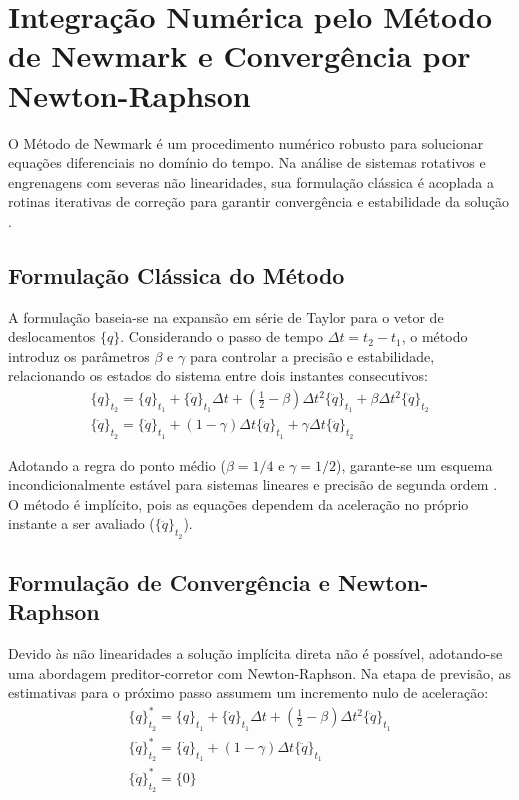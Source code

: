 
\appendix
\chapter{Integração Numérica pelo Método de Newmark e Convergência por Newton-Raphson}
\label{ap:newmark_nr}

O Método de Newmark \cite{newmark} é um procedimento numérico robusto para solucionar equações diferenciais no domínio do tempo. Na análise de sistemas rotativos e engrenagens com severas não linearidades, sua formulação clássica é acoplada a rotinas iterativas de correção para garantir convergência e estabilidade da solução \cite{lais2022}.

\section{Formulação Clássica do Método}

A formulação baseia-se na expansão em série de Taylor para o vetor de deslocamentos $\{q\}$. Considerando o passo de tempo $\Delta t = t_2 - t_1$, o método introduz os parâmetros $\beta$ e $\gamma$ para controlar a precisão e estabilidade, relacionando os estados do sistema entre dois instantes consecutivos:
\begin{gather}
	\{q\}_{t_2} = \{q\}_{t_1} + \{\dot{q}\}_{t_1}\Delta t + \left( \frac{1}{2} - \beta \right) \Delta t^2 \{\ddot{q}\}_{t_1} + \beta \Delta t^2 \{\ddot{q}\}_{t_2}
\\
	\{\dot{q}\}_{t_2} = \{\dot{q}\}_{t_1} + (1 - \gamma)\Delta t \{\ddot{q}\}_{t_1} + \gamma \Delta t \{\ddot{q}\}_{t_2}
\end{gather}

Adotando a regra do ponto médio ($\beta = 1/4$ e $\gamma = 1/2$), garante-se um esquema incondicionalmente estável para sistemas lineares e precisão de segunda ordem \cite{lais2022}. O método é implícito, pois as equações dependem da aceleração no próprio instante a ser avaliado ($\{\ddot{q}\}_{t_2}$).

\newpage
\section{Formulação de Convergência e Newton-Raphson}

Devido às não linearidades a solução implícita direta não é possível, adotando-se uma abordagem preditor-corretor com Newton-Raphson. Na etapa de previsão, as estimativas para o próximo passo assumem um incremento nulo de aceleração:
\begin{gather}
	\{q\}^*_{t_2} = \{q\}_{t_1} + \{\dot{q}\}_{t_1}\Delta t + \left( \frac{1}{2} - \beta \right) \Delta t^2 \{\ddot{q}\}_{t_1}
\\
	\{\dot{q}\}^*_{t_2} = \{\dot{q}\}_{t_1} + (1 - \gamma)\Delta t \{\ddot{q}\}_{t_1}
\\
	\{\ddot{q}\}^*_{t_2} = \{0\}
\end{gather}

